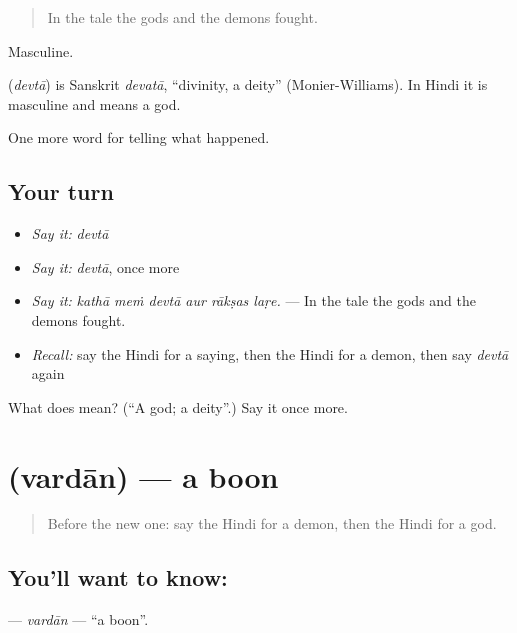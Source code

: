 \begin{quote}
In the tale the gods and the demons fought.
\end{quote}

Masculine.

\begin{cousinweb}
\textbf{} (\emph{devtā}) is Sanskrit \emph{devatā}, \textquotedblleft{}divinity, a deity\textquotedblright{} (Monier-Williams). In Hindi it is masculine and means a god.
\end{cousinweb}

\begin{grammarlens}[title={What you've built}]
One more word for telling what happened.
\end{grammarlens}

\subsection*{Your turn}
\begin{itemize}
\raggedright
  \item \emph{Say it:} \emph{devtā}
  \item \emph{Say it:} \emph{devtā}, once more
  \item \emph{Say it:} \emph{kathā meṁ devtā aur rākṣas laṛe.} — In the tale the gods and the demons fought.
  \item \emph{Recall:} say the Hindi for a saying, then the Hindi for a demon, then say \emph{devtā} again
\end{itemize}

\begin{tcolorbox}[breakable,colback=teal!4,colframe=teal!35!black,title={Before you move on}]
What does  mean? (\textquotedblleft{}A god; a deity\textquotedblright{}.) Say it once more.
\end{tcolorbox}
\section[\texorpdfstring{\hi{वरदान} (vardān)}{वरदान (vardān)}]{ (vardān) — a boon}

\label{lesson:HI-C335-vardan}



\begin{quote}
Before the new one: say the Hindi for a demon, then the Hindi for a god.
\end{quote}

\subsection*{You'll want to know: }
\textbf{} — \emph{vardān} — \textquotedblleft{}a boon\textquotedblright{}.

